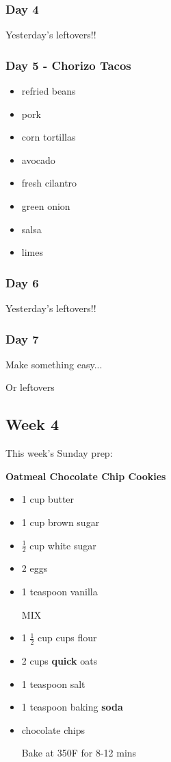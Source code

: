 \documentclass[11pt, a4paper]{article}
\begin{document}
\subsubsection{Day 4}
\vspace{1pc}
Yesterday's leftovers!!

\subsubsection{Day 5 - Chorizo Tacos}
\vspace{1pc}
\begin{itemize}
\item refried beans
\item pork
\item corn tortillas
\item avocado
\item fresh cilantro
\item green onion
\item salsa
\item limes 
\end{itemize}

\subsubsection{Day 6}
\vspace{1pc}
Yesterday's leftovers!!

\subsubsection{Day 7}
\vspace{1pc}
\noindent Make something easy...
\par
Or leftovers


\vspace{0.917 pc} %


\pagebreak
\subsection{Week 4}

This week's Sunday prep:
\par
\vspace{1pc}
\noindent\textbf{Oatmeal Chocolate Chip Cookies}
\par

\begin{itemize}
\item 1 cup butter
\item 1 cup brown sugar
\item $\frac{1}{2}$ cup white sugar
\item 2 eggs
\item 1 teaspoon vanilla
\par
MIX
\item 1 $\frac{1}{2}$ cup cups flour
\item 2 cups \textbf{quick} oats
\item 1 teaspoon salt
\item 1 teaspoon baking \textbf{soda}
\item chocolate chips
\par
Bake at 350F for 8-12 mins
\end{itemize}
\end{document}

